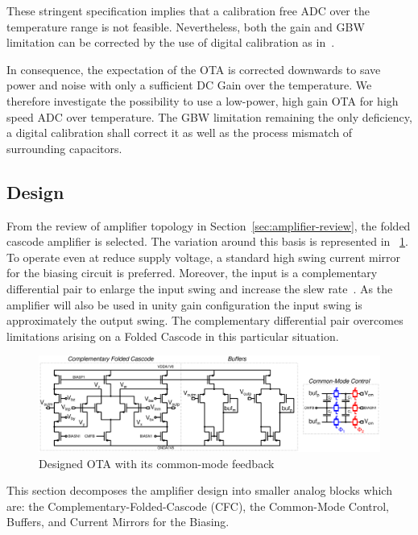 These stringent specification implies that a calibration free ADC over the temperature range is not feasible. Nevertheless, both the gain and GBW limitation can be corrected by the use of digital calibration as in~\cite{Sahoo2013, Bafandeh2016}.

In consequence, the expectation of the OTA is corrected downwards to save power and noise with only a sufficient DC Gain over the temperature. We therefore investigate the possibility to use a low-power, high gain OTA for high speed ADC over temperature. The GBW limitation remaining the only deficiency, a digital calibration shall correct it as well as the process mismatch of surrounding capacitors.

    \subsection{Design}                          %
From the review of amplifier topology in Section~\ref{sec:amplifier-review}, the folded cascode amplifier is selected. The variation around this basis is represented in \figurename~\ref{fig:ota_cfc_buf}. To operate even at reduce supply voltage, a standard high swing current mirror for the biasing circuit is preferred. Moreover, the input is a complementary differential pair to enlarge the input swing and increase the slew rate~\cite{Olivera1999}. As the amplifier will also be used in unity gain configuration the input swing is approximately the output swing. The complementary differential pair overcomes limitations arising on a Folded Cascode in this particular situation.

\begin{figure}[htp]
    \centering
    \includegraphics[width=\textwidth]{Chapter7/Figs/ota_cfc_buf_high_swing_gb}
    \caption{Designed OTA with its common-mode feedback}
    \label{fig:ota_cfc_buf}
\end{figure}

This section decomposes the amplifier design into smaller analog blocks which are: the Complementary-Folded-Cascode (CFC), the Common-Mode Control, Buffers, and Current Mirrors for the Biasing.

